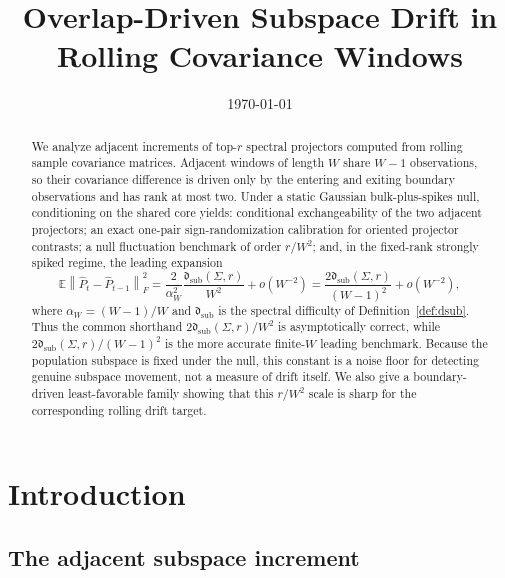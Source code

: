 \documentclass[11pt]{article}
\title{Overlap-Driven Subspace Drift in Rolling Covariance Windows}
\date{\today}
\theoremstyle{tightplain}
\theoremstyle{tightdef}
\newcommand{\E}{\mathbb E}
\newcommand{\norm}[1]{\left\lVert #1 \right\rVert}
\newcommand{\dsub}{\mathfrak d_{\mathrm{sub}}}
\begin{document}
\maketitle


\begin{abstract}
We analyze adjacent increments of top-$r$ spectral projectors computed from
rolling sample covariance matrices. Adjacent windows of length $W$ share
$W-1$ observations, so their covariance difference is driven only by the
entering and exiting boundary observations and has rank at most two. Under a
static Gaussian bulk-plus-spikes null, conditioning on the shared core yields:
conditional exchangeability of the two adjacent projectors; an exact one-pair
sign-randomization calibration for oriented projector contrasts; a null
fluctuation benchmark of order $r/W^2$; and, in the fixed-rank strongly spiked
regime, the leading expansion
\[
\E\norm{\widehat P_t-\widehat P_{t-1}}_F^2
=\frac{2}{\alpha_W^2}\frac{\dsub(\Sigma,r)}{W^2}
+o(W^{-2})
=
\frac{2\dsub(\Sigma,r)}{(W-1)^2}
+o(W^{-2}),
\]
where $\alpha_W=(W-1)/W$ and $\dsub$ is the spectral difficulty of
Definition~\ref{def:dsub}. Thus the common shorthand
$2\dsub(\Sigma,r)/W^2$ is asymptotically correct, while
$2\dsub(\Sigma,r)/(W-1)^2$ is the more accurate finite-$W$ leading
benchmark. Because the population subspace is fixed under the null, this
constant is a noise floor for detecting genuine subspace movement, not a
measure of drift itself. We also give a boundary-driven least-favorable family
showing that this $r/W^2$ scale is sharp for the corresponding rolling drift
target.
\end{abstract}

\section{Introduction}

\subsection{The adjacent subspace increment}
\end{document}
